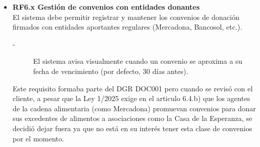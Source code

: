 \begin{itemize}
    \item \textbf{RF6.x Gestión de convenios con entidades donantes} \\
    El sistema debe permitir registrar y mantener los convenios de donación
    firmados con entidades aportantes regulares (Mercadona, Bancosol, etc.).
    \begin{description}
        \item[-] El sistema avisa visualmente cuando un convenio se aproxima a su
        fecha de vencimiento (por defecto, 30 días antes).
    \end{description}
    \par
    Este requisito formaba parte del DGR DOC001 pero cuando se revisó con el cliente, a pesar que la Ley 1/2025 exige 
    en el articulo 6.4.b) que los agentes de la cadena alimentaria (como Mercadona) promuevan convenios para donar sus excedentes de alimentos a  %
    asociaciones como la Casa de la Esperanza, se decidió dejar fuera ya que no está en su interés tener esta clase de convenios por el momento.
\end{itemize} %